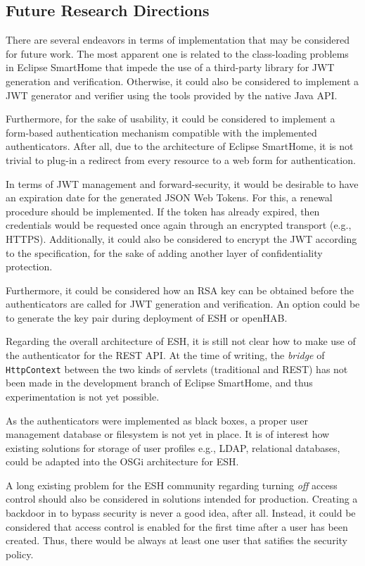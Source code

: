 \documentclass[12pt]{article}
\begin{document}
\subsection{Future Research Directions}

There are several endeavors in terms of implementation that may be considered for future work. The most apparent one is related to the class-loading problems in Eclipse SmartHome that impede the use of a third-party library for JWT generation and verification. Otherwise, it could also be considered to implement a JWT generator and verifier using the tools provided by the native Java API.

Furthermore, for the sake of usability, it could be considered to implement a form-based authentication mechanism compatible with the implemented authenticators. After all, due to the architecture of Eclipse SmartHome, it is not trivial to plug-in a redirect from every resource to a web form for authentication.

In terms of JWT management and forward-security, it would be desirable to have an expiration date for the generated JSON Web Tokens. For this, a renewal procedure should be implemented. If the token has already expired, then credentials would be requested once again through an encrypted transport (e.g., HTTPS). Additionally, it could also be considered to encrypt the JWT according to the specification, for the sake of adding another layer of confidentiality protection.

Furthermore, it could be considered how an RSA key can be obtained before the authenticators are called for JWT generation and verification. An option could be to generate the key pair during deployment of ESH or openHAB. 

Regarding the overall architecture of ESH, it is still not clear how to make use of the authenticator for the REST API. At the time of writing, the \emph{bridge} of \texttt{HttpContext} between the two kinds of servlets (traditional and REST) has not been made in the development branch of Eclipse SmartHome, and thus experimentation is not yet possible.

As the authenticators were implemented as black boxes, a proper user management database or filesystem is not yet in place. It is of interest how existing solutions for storage of user profiles e.g., LDAP, relational databases, could be adapted into the OSGi architecture for ESH.

A long existing problem for the ESH community regarding turning \emph{off} access control should also be considered in solutions intended for production. Creating a backdoor in to bypass security is never a good idea, after all. Instead, it could be considered that access control is enabled for the first time after a user has been created. Thus, there would be always at least one user that satifies the security policy. 
\end{document}
